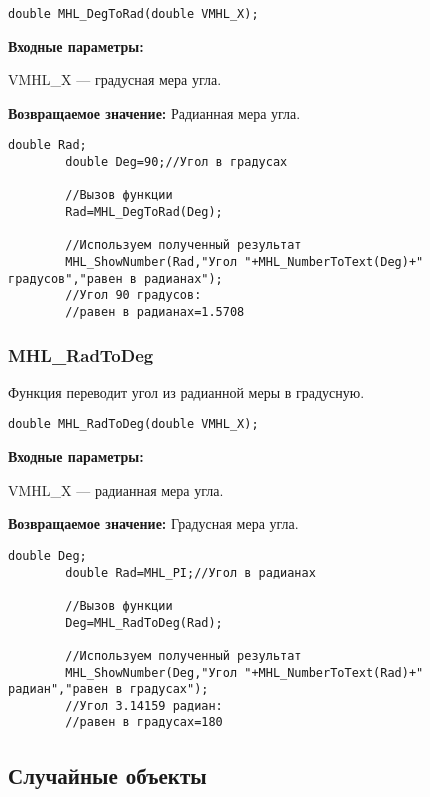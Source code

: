 \documentclass[a4paper,12pt]{article}
\begin{document}
\begin{lstlisting}[label=code_syntax_MHL_DegToRad,caption=Синтаксис]
double MHL_DegToRad(double VMHL_X);
\end{lstlisting}

\textbf{Входные параметры:}

 VMHL\_X --- градусная мера угла.

\textbf{Возвращаемое значение:}
Радианная мера угла.


\begin{lstlisting}[label=code_use_MHL_DegToRad,caption=Пример использования]
        double Rad;
        double Deg=90;//Угол в градусах

        //Вызов функции
        Rad=MHL_DegToRad(Deg);

        //Используем полученный результат
        MHL_ShowNumber(Rad,"Угол "+MHL_NumberToText(Deg)+" градусов","равен в радианах");
        //Угол 90 градусов:
        //равен в радианах=1.5708
\end{lstlisting}

\subsubsection{MHL\_RadToDeg}\label{MHL_RadToDeg}

Функция переводит угол из радианной меры в градусную.


\begin{lstlisting}[label=code_syntax_MHL_RadToDeg,caption=Синтаксис]
double MHL_RadToDeg(double VMHL_X);
\end{lstlisting}

\textbf{Входные параметры:}

 VMHL\_X --- радианная мера угла.

\textbf{Возвращаемое значение:}
Градусная мера угла.


\begin{lstlisting}[label=code_use_MHL_RadToDeg,caption=Пример использования]
        double Deg;
        double Rad=MHL_PI;//Угол в радианах

        //Вызов функции
        Deg=MHL_RadToDeg(Rad);

        //Используем полученный результат
        MHL_ShowNumber(Deg,"Угол "+MHL_NumberToText(Rad)+" радиан","равен в градусах");
        //Угол 3.14159 радиан:
        //равен в градусах=180
\end{lstlisting}

\subsection{Случайные объекты}
\end{document}
